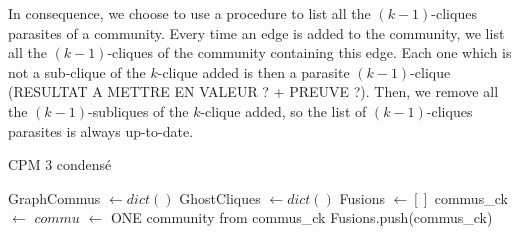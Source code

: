 In consequence, we choose to use a procedure to list all the $(k-1)$-cliques parasites of a community. Every time an edge  is added to the community, we list all the $(k-1)$-cliques of the community containing this edge. Each one which is not a sub-clique of the $k$-clique added is then a parasite $(k-1)$-clique (RESULTAT A METTRE EN VALEUR ? + PREUVE ?). Then, we remove all the $(k-1)$-subliques of the $k$-clique added, so the list of $(k-1)$-cliques parasites is always up-to-date.

\begin{algorithm}
  \caption{CPM 3 condensé}
  \begin{algorithmic}[1]
    \State GraphCommus $\gets dict()$ %
    \State GhostCliques $\gets dict()$ %
    \State Fusions $\gets []$ %
    \State commus\_ck $\gets$ 
    \State {} 
    \Else {}
    \State $commu$ $\gets$ ONE community from commus\_ck
    \State {}
     
    \State Fusions.push(commus\_ck) 
    \EndIf
    \EndIf
    \EndFor
    \State {}
  \end{algorithmic}
\end{algorithm}